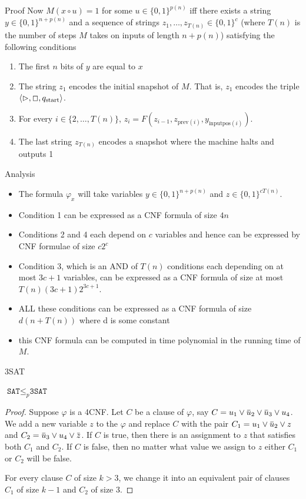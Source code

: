 \documentclass[presentation]{beamer}
\def \start {\text{start}}
\def \SAT {\texttt{SAT}}
\def \TSAT {\texttt{3SAT}}
\begin{document}
\begin{frame}[label={sec:org42502b6}]{Proof}
Now \(M(x\circ u)=1\) for some \(u\in\{0,1\}^{p(n)}\) iff
 there exists a string \(y\in\{0,1\}^{n+p(n)}\) and a sequence of strings
 \(z_1,\dots,z_{T(n)}\in\{0,1\}^c\) (where \(T(n)\) is the number of steps \(M\) takes on inputs
 of length \(n+p(n)\)) satisfying the following conditions
\begin{enumerate}
\item The first \(n\) bits of \(y\) are equal to \(x\)
\item The string \(z_1\) encodes the initial snapshot of \(M\). That is, \(z_1\) encodes the
triple \(\la\rhd,\Box,q_{\start}\ra\).
\item For every \(i\in\{2,\dots,T(n)\}\), \(z_i=F(z_{i-1},z_{\text{prev}(i)},y_{\text{inputpos}(i)})\).
\item The last string \(z_{T(n)}\) encodes a snapshot where the machine halts and outputs 1
\end{enumerate}
\end{frame}
\begin{frame}[label={sec:orga15d7da}]{Analysis}
\begin{itemize}
\item The formula \(\varphi_x\) will take variables \(y\in\{0,1\}^{n+p(n)}\)
and \(z\in\{0,1\}^{cT(n)}\).

\item Condition 1 can be expressed as a CNF formula of size \(4n\)
\item Conditions 2 and 4 each depend on \(c\) variables and hence can be expressed by CNF formulae of
size \(c2^c\)
\item Condition 3, which is an AND of \(T(n)\) conditions each  depending on at most \(3c+1\)
variables, can be expressed as a CNF formula of size at most \(T(n)(3c+1)2^{3c+1}\).
\item ALL these conditions can be expressed as a CNF formula of size \(d(n+T(n))\) where d is some constant
\item this CNF formula can be computed in time polynomial in the running time of \(M\).
\end{itemize}
\end{frame}
\begin{frame}[label={sec:org5d7e086}]{3SAT}
\begin{lemma}[]
\(\SAT\le_p\TSAT\)
\end{lemma}

\begin{proof}
Suppose \(\varphi\) is a 4CNF. Let \(C\) be a clause of \(\varphi\), say \(C=u_1\vee\baru_2\vee\baru_3\vee u_4\).
We add a new variable \(z\) to the \(\varphi\) and replace \(C\) with the pair
\(C_1=u_1\vee\baru_2\vee z\) and \(C_2=\baru_3\vee u_4\vee\barz\). If \(C\) is true, then there
is an assignment to \(z\) that satisfies both \(C_1\) and \(C_2\). If \(C\) is false, then no
matter what value we assign to \(z\) either \(C_1\) or \(C_2\) will be false.


For every clause \(C\) of size \(k>3\), we change it into an equivalent pair of clauses \(C_1\)
of size \(k-1\) and \(C_2\) of size 3.
\end{proof}
\end{frame}
\end{document}
